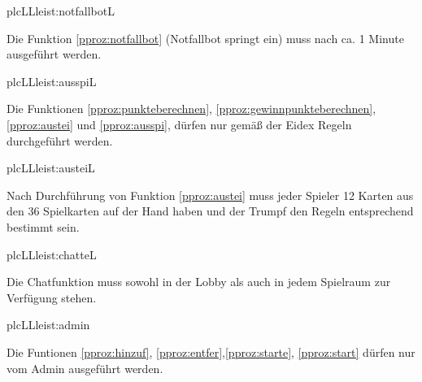 \begin{description}[leftmargin=5em, style=sameline]
	\begin{lhp}{plc}{LL}{leist:notfallbotL}
		\item Die Funktion \ref{pproz:notfallbot} (Notfallbot springt ein) muss nach ca. 1 Minute ausgeführt werden.
	\end{lhp}

	\begin{lhp}{plc}{LL}{leist:ausspiL}
		\item Die Funktionen \ref{pproz:punkteberechnen}, \ref{pproz:gewinnpunkteberechnen}, \ref{pproz:austei} und \ref{pproz:ausspi}, dürfen nur gemäß der Eidex Regeln durchgeführt werden.
	\end{lhp}

	\begin{lhp}{plc}{LL}{leist:austeiL}
		\item Nach Durchführung von Funktion \ref{pproz:austei} muss jeder Spieler 12 Karten aus den 36 Spielkarten auf der Hand haben und der Trumpf den Regeln entsprechend bestimmt sein.
	\end{lhp}

	\begin{lhp}{plc}{LL}{leist:chatteL}
		\item Die Chatfunktion muss sowohl in der Lobby als auch in jedem Spielraum zur Verfügung stehen.
	\end{lhp}
	
	
		\begin{lhp}{plc}{LL}{leist:admin}
			\item
			Die Funtionen \ref{pproz:hinzuf}, \ref{pproz:entfer},\ref{pproz:starte}, \ref{pproz:start} dürfen nur vom Admin
			ausgeführt werden.
		\end{lhp}
	
		

\end{description}